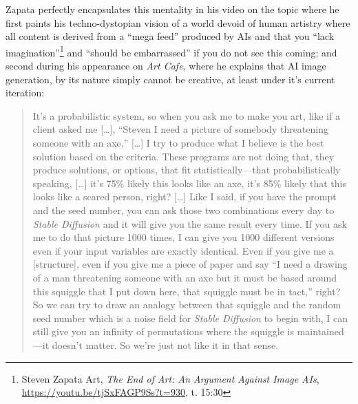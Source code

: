 \documentclass[11pt]{article}
\begin{document}
Zapata perfectly encapsulates this mentality in his video on the topic where he first paints his techno-dystopian vision of a world devoid of human artistry where all content is derived from a ``mega feed'' produced by AIs and that you ``lack imagination''\footnote{Steven Zapata Art, \emph{The End of Art: An Argument Against Image AIs}, \url{https://youtu.be/tjSxFAGP9Ss?t=930}, t. 15:30} and ``should be embarrassed'' if you do not see this coming; and second during his appearance on \emph{Art Cafe}, where he explains that AI image generation, by its nature simply cannot be creative, at least under it's current iteration:
\begin{quote}
It's a probabilistic system, so when you ask me to make you art, like if a client asked me [\ldots{}], ``Steven I need a picture of somebody threatening someone with an axe,'' [\ldots{}] I try to produce what I believe is the best solution based on the criteria. These programs are not doing that, they produce solutions, or options, that fit statistically---that probabilistically speaking, [\ldots{}] it's 75\% likely this looks like an axe, it's 85\% likely that this looks like a scared person, right? [\ldots{}] Like I said, if you have the prompt and the seed number, you can ask those two combinations every day to \emph{Stable Diffusion} and it will give you the same result every time. If you ask me to do that picture 1000 times, I can give you 1000 different versions even if your input variables are exactly identical. Even if you give me a [structure], even if you give me a piece of paper and say ``I need a drawing of a man threatening someone with an axe but it must be based around this squiggle that I put down here, that squiggle must be in tact,'' right? So we can try to draw an analogy between that squiggle and the random seed number which is a noise field for \emph{Stable Diffusion} to begin with, I can still give you an infinity of permutations where the squiggle is maintained---it doesn't matter. So we're just not like it in that sense.


\end{quote}
\end{document}
